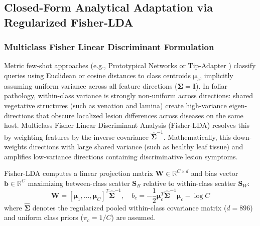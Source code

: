 \documentclass[preprint,12pt]{elsarticle}
\begin{document}
\subsection{Closed-Form Analytical Adaptation via Regularized Fisher-LDA}
\label{sec:fisher_adaptation}

\subsubsection{Multiclass Fisher Linear Discriminant Formulation}
Metric few-shot approaches (e.g., Prototypical Networks \cite{snell2017prototypical} or Tip-Adapter \cite{zhang2022tip}) classify queries using Euclidean or cosine distances to class centroids $\boldsymbol{\mu}_c$, implicitly assuming uniform variance across all feature directions ($\mathbf{\Sigma} = \mathbf{I}$). In foliar pathology, within-class variance is strongly non-uniform across directions: shared vegetative structures (such as venation and lamina) create high-variance eigen-directions that obscure localized lesion differences across diseases on the same host. Multiclass Fisher Linear Discriminant Analysis (Fisher-LDA) \cite{fisher1936use, rao1948utilization} resolves this by weighting features by the inverse covariance $\hat{\mathbf{\Sigma}}^{-1}$. Mathematically, this down-weights directions with large shared variance (such as healthy leaf tissue) and amplifies low-variance directions containing discriminative lesion symptoms.

Fisher-LDA computes a linear projection matrix $\mathbf{W} \in \mathbb{R}^{C \times d}$ and bias vector $\mathbf{b} \in \mathbb{R}^C$ maximizing between-class scatter $\mathbf{S}_B$ relative to within-class scatter $\mathbf{S}_W$:
\begin{equation}
    \label{eq:fisher_weights}
    \mathbf{W} = [\boldsymbol{\mu}_1, \dots, \boldsymbol{\mu}_C]^T \hat{\mathbf{\Sigma}}^{-1}, \quad
    b_c = -\frac{1}{2} \boldsymbol{\mu}_c^T \hat{\mathbf{\Sigma}}^{-1} \boldsymbol{\mu}_c - \log C
\end{equation}
where $\hat{\mathbf{\Sigma}}$ denotes the regularized pooled within-class covariance matrix ($d=896$) and uniform class priors ($\pi_c = 1/C$) are assumed.
\end{document}
